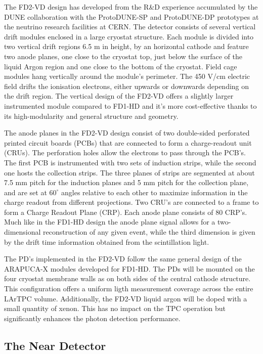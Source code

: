 The FD2-VD design has developed from the R\&D experience accumulated by the DUNE collaboration with the ProtoDUNE-SP and ProtoDUNE-DP prototypes at the neutrino research facilities at CERN. The detector consists of several vertical drift modules enclosed in a large cryostat structure. Each module is divided into two vertical drift regions 6.5 m in height, by an horizontal cathode and feature two anode planes, one close to the cryostat top, just below the surface of the liquid Argon region and one close to the bottom of the cryostat. Field cage modules hang vertically around the module's perimeter. The 450 V/cm electric field drifts the ionisation electrons, either upwards or downwards depending on the drift region. The vertical design of the FD2-VD offers a slightly larger instrumented module compared to FD1-HD and it's more cost-effective thanks to its high-modularity and general structure and geometry. 

The anode planes in the FD2-VD design consist of two double-sided perforated printed circuit boards (PCBs) that are connected to form a charge-readout unit (CRUs). The perforation holes allow the electrons to pass through the PCB's. The first PCB is instrumented with two sets of induction strips, while the second one hosts the collection strips. The three planes of strips are segmented at about 7.5 mm pitch for the induction planes and 5 mm pitch for the collection plane, and are set at $60^\circ$ angles relative to each other to maximize information in the charge readout from different projections. Two CRU's are connected to a frame to form a Charge Readout Plane (CRP). Each anode plane consists of 80 CRP's. Much like in the FD1-HD design the anode plane signal allows for a two-dimensional reconstruction of any given event, while the third dimension is given by the drift time information obtained from the scintillation light.

The PD's implemented in the FD2-VD follow the same general design of the ARAPUCA-X modules developed for FD1-HD. The PDs will be mounted on the four cryostat membrane walls as on both sides of the central cathode structure. This configuration offers a uniform ligth measurement coverage across the entire LArTPC volume. Additionally, the FD2-VD liquid argon will be doped with a small quantity of xenon. This has no impact on the TPC operation but significantly enhances the photon detection performance.

\subsection{The Near Detector}

